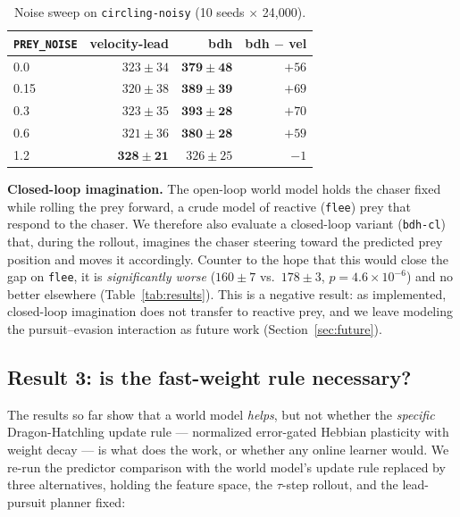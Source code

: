 \documentclass[11pt]{article}
\begin{document}
\begin{table}[t]
\centering
\caption{Noise sweep on \texttt{circling-noisy} (10 seeds $\times$ 24{,}000).}
\label{tab:noise}
\small
\begin{tabular}{lrrr}
\toprule
\texttt{PREY\_NOISE} & velocity-lead & bdh & bdh $-$ vel \\
\midrule
0.0  & \emph{$323 \pm 34$} & $\mathbf{379 \pm 48}$ & $+56$ \\
0.15 & \emph{$320 \pm 38$} & $\mathbf{389 \pm 39}$ & $+69$ \\
0.3  & \emph{$323 \pm 35$} & $\mathbf{393 \pm 28}$ & $+70$ \\
0.6  & \emph{$321 \pm 36$} & $\mathbf{380 \pm 28}$ & $+59$ \\
1.2  & $\mathbf{328 \pm 21}$ & \emph{$326 \pm 25$} & $-1$ \\
\bottomrule
\end{tabular}
\end{table}

\textbf{Closed-loop imagination.} The open-loop world model holds the chaser fixed while
rolling the prey forward, a crude model of reactive (\texttt{flee}) prey that respond to the
chaser. We therefore also evaluate a closed-loop variant (\texttt{bdh-cl}) that, during the
rollout, imagines the chaser steering toward the predicted prey position and moves it
accordingly. Counter to the hope that this would close the gap on \texttt{flee}, it is
\emph{significantly worse} ($160 \pm 7$ vs.\ $178 \pm 3$, $p = 4.6 \times 10^{-6}$) and no
better elsewhere (Table~\ref{tab:results}). This is a negative result: as implemented, closed-loop imagination
does not transfer to reactive prey, and we leave modeling the pursuit--evasion interaction as
future work (Section~\ref{sec:future}).

\subsection{Result 3: is the fast-weight rule necessary?}\label{sec:formulation}

The results so far show that a world model \emph{helps}, but not whether the \emph{specific}
Dragon-Hatchling update rule --- normalized error-gated Hebbian plasticity with weight decay ---
is what does the work, or whether any online learner would. We re-run the predictor comparison
with the world model's update rule replaced by three alternatives, holding the feature space,
the $\tau$-step rollout, and the lead-pursuit planner fixed:
\end{document}
